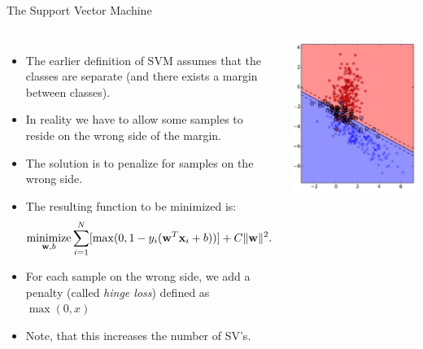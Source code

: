 \documentclass[10pt, aspectratio=169]{beamer} %
\newcommand{\w}{{\bf w}}
\newcommand{\x}{{\bf x}}
\begin{document}
\begin{frame}[fragile,allowframebreaks=0.8]
 {The Support Vector Machine}
\begin{columns}[onlytextwidth]
\begin{itemize}
\item The earlier definition of SVM assumes that the classes are separate (and
there exists a margin between classes).
\item In reality we have to allow some samples to reside on the wrong side of the margin.
\item The solution is to penalize for samples on the wrong side.
\item The resulting function to be minimized is:
\begin{gather*}
\mathop{\text{minimize}}_{\w, b} \sum_{i=1}^{N} [\max(0, 1-y_i(\w^T\x_i + b))] + C\|\w\|^2.
\end{gather*}
\item For each sample on the wrong side, we add a penalty (called \textit{hinge loss}) defined as
\(
\max(0, x)
\)
\item Note, that this increases the number of SV's.
\end{itemize}
\includegraphics[width=\columnwidth]{SVM_boundary_overlap.pdf}\\

\end{columns}
\end{frame}
\end{document}
